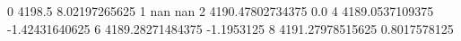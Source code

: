 0 4198.5 8.02197265625
1 nan nan
2 4190.47802734375 0.0
4 4189.0537109375 -1.42431640625
6 4189.28271484375 -1.1953125
8 4191.27978515625 0.8017578125
